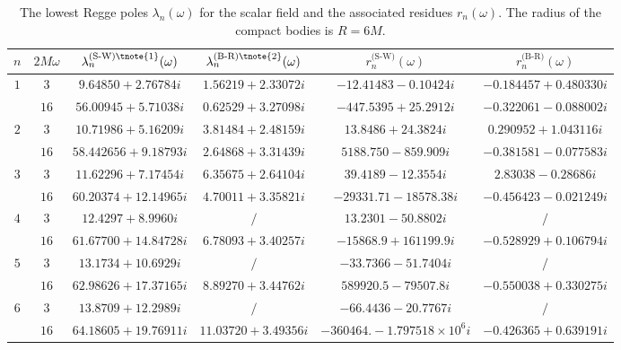 \documentclass[aps,prd,longbibliography,reprint,twocolumn,amsmath,amssymb,amsfonts,showpacs,footnote,superscriptaddress]{revtex4-1}%
\begin{document}
\begingroup
\squeezetable
\begin{table}[htp]
\begin{threeparttable}[htp]
\caption{\label{tab:table1} The lowest Regge poles $\lambda_{n}(\omega)$ for the scalar field and the associated residues $r_{n}(\omega)$. The radius of the compact bodies is $R = 6M$.}
\smallskip
\centering
\begin{ruledtabular}
\begin{tabular}{cccccc}
 $n$ & $2 M \omega$  & $\lambda^{\text{(S-W)\tnote{1}}}_n(\omega)$ & $\lambda^{\text{(B-R)\tnote{2}}}_n(\omega)$ & $r^{\text{(S-W)}}_{n}(\omega)$ & $r^{\text{(B-R)}}_{n}(\omega)$
 \\ \hline
$1$  & $3$  & $ 9.64850+2.76784 i$  & $1.56219+2.33072 i$  & $-12.41483-0.10424 i$  & $ -0.184457+0.480330 i$    \\
     & $16$  & $56.00945+5.71038 i$  & $ 0.62529+3.27098 i$  & $-447.5395+25.2912 i$  & $-0.322061-0.088002 i $  \\

$2$  & $3$  & $ 10.71986+5.16209 i $  & $3.81484+2.48159 i$  & $13.8486+24.3824 i$  & $0.290952+1.043116 i$    \\
     & $16$  & $ 58.442656+9.18793 i$ & $2.64868+3.31439 i$  & $5188.750-859.909 i$  & $ -0.381581-0.077583 i$    \\

$3$  & $3$  & $11.62296+7.17454 i$  & $ 6.35675+2.64104 i$  & $39.4189-12.3554 i$ & $2.83038-0.28686 i$    \\
     & $16$  & $60.20374+12.14965 i$  & $4.70011+3.35821 i$  & $-29331.71-18578.38 i$  & $-0.456423-0.021249 i$ \\

$4$  & $3$  & $ 12.4297+8.9960 i$  & $/$  & $ 13.2301-50.8802 i$ & $/$    \\
     & $16$  & $ 61.67700+14.84728 i $  & $6.78093+3.40257 i$  & $-15868.9+161199.9 i$  & $-0.528929+0.106794 i$ \\

$5$  & $3$  & $13.1734+10.6929 i$  & $/$  & $-33.7366-51.7404 i$ & $/$     \\
     & $16$  & $62.98626+17.37165 i$  & $8.89270+3.44762 i$  & $589920.5-79507.8 i$  & $-0.550038+0.330275 i$    \\

$6$  & $3$  & $13.8709+12.2989 i$  & $/$   & $-66.4436-20.7767 i$ & $/$    \\
     & $16$  & $ 64.18605+19.76911 i$  & $11.03720+3.49356 i$  & $-360464.-1.797518\times 10^6 i$  & $ -0.426365+0.639191 i$    \\


\end{tabular}
\end{ruledtabular}
\end{threeparttable}
\end{table}
\end{document}
